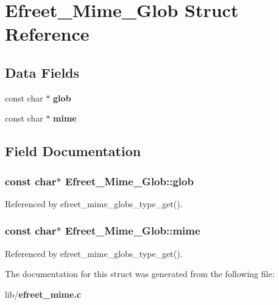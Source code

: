 \section{Efreet\_\-Mime\_\-Glob Struct Reference}
\label{structEfreet__Mime__Glob}
\subsection*{Data Fields}
\begin{CompactItemize}
\item 
const char $\ast$ {\bf glob}
\item 
const char $\ast$ {\bf mime}
\end{CompactItemize}


\subsection{Field Documentation}
\subsubsection{\setlength{\rightskip}{0pt plus 5cm}const char$\ast$ {\bf Efreet\_\-Mime\_\-Glob::glob}}\label{structEfreet__Mime__Glob_6d7e45d5470bd6f10fc6ff15401e6ab6}




Referenced by efreet\_\-mime\_\-globs\_\-type\_\-get().
\subsubsection{\setlength{\rightskip}{0pt plus 5cm}const char$\ast$ {\bf Efreet\_\-Mime\_\-Glob::mime}}\label{structEfreet__Mime__Glob_9fdb0d988cc41acd5e3f4362a18113ba}




Referenced by efreet\_\-mime\_\-globs\_\-type\_\-get().

The documentation for this struct was generated from the following file:\begin{CompactItemize}
\item 
lib/{\bf efreet\_\-mime.c}\end{CompactItemize}
